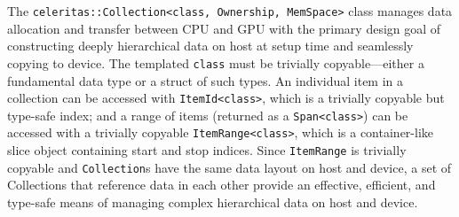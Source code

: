 The
\texttt{celeritas::Collection\textless{}class,\ Ownership,\ MemSpace\textgreater{}}
class manages data allocation and transfer between CPU and GPU with the
primary design goal of constructing deeply hierarchical data on host at
setup time and seamlessly copying to device. The templated
\texttt{class} must be trivially copyable---either a fundamental data
type or a struct of such types. An individual item in a collection can
be accessed with \texttt{ItemId\textless{}class\textgreater{}}, which is a
trivially copyable but type-safe index; and a range of items (returned
as a \texttt{Span\textless{}class\textgreater{}}) can be accessed with a
trivially copyable \texttt{ItemRange\textless{}class\textgreater{}},
which is a container-like slice object containing start and stop
indices. Since \texttt{ItemRange} is trivially copyable and
\texttt{Collection}s have the same data layout on host and device, a set
of Collections that reference data in each other provide an effective,
efficient, and type-safe means of managing complex hierarchical data on
host and device.


